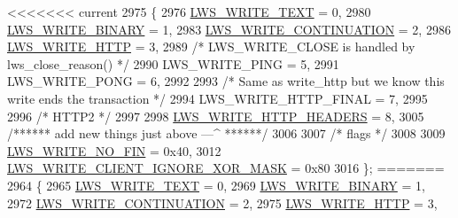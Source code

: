 \begin{DoxyCode}
<<<<<<< current
2975                         \{
2976         \hyperlink{group__sending-data_gga98b099cf8c1c7e38ad78501f270e193da80e8f169fda236c56bfb795ed62903db}{LWS\_WRITE\_TEXT}                                            = 0,
2980         \hyperlink{group__sending-data_gga98b099cf8c1c7e38ad78501f270e193daf6486c0dba50c44198100717721d9ab2}{LWS\_WRITE\_BINARY}                                        = 1,
2983         \hyperlink{group__sending-data_gga98b099cf8c1c7e38ad78501f270e193da10047eb05b5e1c298151dc47a5b44826}{LWS\_WRITE\_CONTINUATION}                                    = 2,
2986         \hyperlink{group__sending-data_gga98b099cf8c1c7e38ad78501f270e193dabb6705e1d1327cdda5025be28f07712e}{LWS\_WRITE\_HTTP}                                            = 3,
2989         \textcolor{comment}{/* LWS\_WRITE\_CLOSE is handled by lws\_close\_reason() */}
2990         LWS\_WRITE\_PING                                          = 5,
2991         LWS\_WRITE\_PONG                                          = 6,
2992 
2993         \textcolor{comment}{/* Same as write\_http but we know this write ends the transaction */}
2994         LWS\_WRITE\_HTTP\_FINAL                                    = 7,
2995 
2996         \textcolor{comment}{/* HTTP2 */}
2997 
2998         \hyperlink{group__sending-data_gga98b099cf8c1c7e38ad78501f270e193dafe5a38e940ce56708ac814627e9c0917}{LWS\_WRITE\_HTTP\_HEADERS}                                    = 8,
3005         \textcolor{comment}{/****** add new things just above ---^ ******/}
3006 
3007         \textcolor{comment}{/* flags */}
3008 
3009         \hyperlink{group__sending-data_gga98b099cf8c1c7e38ad78501f270e193da115440f272a5d55518adfc8099acfee3}{LWS\_WRITE\_NO\_FIN} = 0x40,
3012         \hyperlink{group__sending-data_gga98b099cf8c1c7e38ad78501f270e193da220d8e8652d9b97fb66e476e2a60ffce}{LWS\_WRITE\_CLIENT\_IGNORE\_XOR\_MASK} = 0x80
3016 \};
=======
2964                         \{
2965         \hyperlink{group__sending-data_gga98b099cf8c1c7e38ad78501f270e193da80e8f169fda236c56bfb795ed62903db}{LWS\_WRITE\_TEXT}                                            = 0,
2969         \hyperlink{group__sending-data_gga98b099cf8c1c7e38ad78501f270e193daf6486c0dba50c44198100717721d9ab2}{LWS\_WRITE\_BINARY}                                        = 1,
2972         \hyperlink{group__sending-data_gga98b099cf8c1c7e38ad78501f270e193da10047eb05b5e1c298151dc47a5b44826}{LWS\_WRITE\_CONTINUATION}                                    = 2,
2975         \hyperlink{group__sending-data_gga98b099cf8c1c7e38ad78501f270e193dabb6705e1d1327cdda5025be28f07712e}{LWS\_WRITE\_HTTP}                                            = 3,

\end{DoxyCode}
